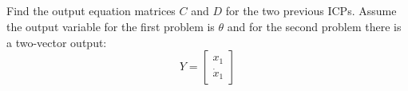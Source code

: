 \documentclass{article}	%
\begin{document}
%
%
%


\subsection{}
Find the output equation matrices $C$ and $D$ for the two previous ICPs.  Assume the output variable
for the first problem is $\theta$ and for the second problem there is a two-vector output:
\[
Y = \begin{bmatrix}x_1\\\dot{x}_1\end{bmatrix}
\]
\end{document}
